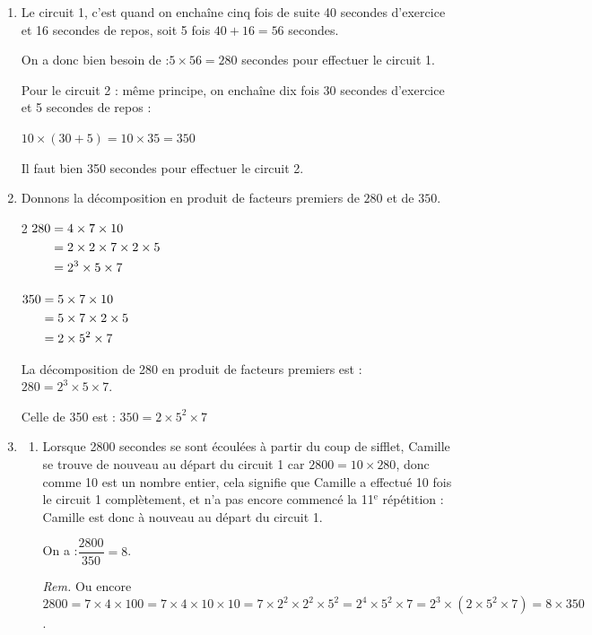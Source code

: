 \documentclass{article}
\begin{document}
\begin{enumerate}
\item Le circuit 1, c'est quand on enchaîne cinq fois de suite 40 secondes d'exercice et 16 secondes de repos, soit 5 fois  $40 + 16 = 56$ secondes.

On a donc bien besoin de  :\quad $5 \times 56 = 280$ secondes pour effectuer le circuit 1.

Pour le circuit 2 : même principe, on enchaîne dix fois 30 secondes d'exercice et 5 secondes de repos :

$10 \times (30 + 5 ) = 10\times 35 = 350$

Il faut bien 350 secondes pour effectuer le circuit 2.

\item Donnons la décomposition en produit de facteurs premiers de $280$ et de $350$.

\begin{multicols}{2}
$\aligned[t] 280 &= 4 \times 7 \times 10\\
&= 2 \times 2 \times 7 \times 2 \times 5\\
&= 2^3 \times 5 \times 7 \\\endaligned$

$\aligned[t] 350 &= 5 \times 7 \times 10\\
&= 5 \times 7 \times 2 \times 5\\
&= 2 \times 5^2 \times 7 \\\endaligned$
\end{multicols}

La décomposition de 280 en produit de facteurs premiers est : \quad $280= 2^3 \times 5 \times 7$.

Celle de 350 est :\phantom{sition de 280 en produit de facteurs premiers} \quad $350= 2 \times 5^2 \times 7$
\item \begin{enumerate}
		\item Lorsque \num{2800} secondes se sont écoulées à partir du coup de sifflet, Camille se trouve de nouveau au départ du circuit 1 car $\num{2800} = 10 \times 280$, donc comme 10 est un nombre entier, cela signifie que Camille a effectué 10 fois le circuit 1 complètement, et n'a pas encore commencé la 11$^\text{e}$ répétition : Camille est donc à nouveau au départ du circuit 1.

On a :\quad $\dfrac{\num{2800}}{350 } = 8$.

\emph{Rem. } Ou encore $\num{2800} = 7 \times 4 \times 100 = 7 \times 4 \times 10 \times 10 =  7 \times 2^2 \times 2^2 \times 5^2 = 2^4 \times 5^2 \times 7 = 2^3 \times (2 \times 5^2 \times 7) = 8 \times 350$.


\end{enumerate}
\end{enumerate}
\end{document}
